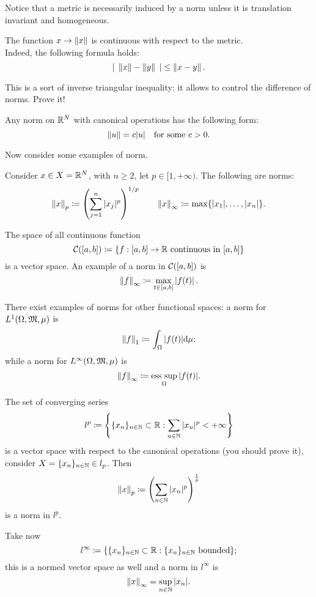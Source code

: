 Notice that a metric is necessarily induced by a norm unless it is translation invariant and homogeneous.

\begin{prop}\label{norm-inequality}
	The function $x \to \left\lVert x\right\rVert$ is continuous with respect to the metric.\\
	Indeed, the following formula holds:
	$$
		| \; \left\lVert x\right\rVert - \left\lVert y\right\rVert \; | 
		\leq \left\lVert x-y\right\rVert
	.
	$$
\end{prop}
This is a sort of inverse triangular inequality: it allows to control the  difference of norms. Prove it!

\begin{prop}
	Any norm on $\mathbb R^N$ with canonical operations has the following form: 
	$$
		\left\lVert u\right\rVert
		= c|u| \quad \text{for some } c>0
	.
	$$
\end{prop}

Now consider some examples of norm.
\begin{exam}
	Consider $x\in X = \mathbb R^N$, with $n \geq 2$, let $p \in [1, +\infty)$. The following are norms:
	$$
		\left\lVert x\right\rVert_p \coloneqq \left(\sum_{j=1}^n |x_j|^p\right)^{1/p}
		\qquad \left\lVert x\right\rVert_\infty \coloneqq \max\{|x_1|,\ldots,|x_n|\}
	.
	$$
\end{exam}
\begin{exam}		
	The space of all continuous function
	$$
		\mathcal C([a,b]) 
		\coloneqq \{f : [a,b]\to \mathbb R \text{ continuous in } [a,b]\}
	$$
	is a vector space. An example of a norm in $\mathcal C([a,b])$ is 
	$$
		\left\lVert f\right\rVert_\infty 
		\coloneqq \max_{t\in[a,b]}\left\lvert f(t)\right\rvert
		.
	$$
\end{exam}
\begin{exam}
	There exist examples of norms for other functional spaces: a norm for $L^1(\Omega, \mathfrak M, \mu)$ is 
	$$
		\left\lVert f\right\rVert_1 
		\coloneqq \int_\Omega |f(t)| \mathrm d \mu
	;
	$$
	while a norm for $L^\infty (\Omega, \mathfrak M, \mu)$ is 
	$$
		\left\lVert f\right\rVert_\infty 
		\coloneqq \operatorname*{ess\ sup}_\Omega |f(t)|
	.
	$$
\end{exam}
\begin{exam}
	The set of converging series 
	$$
		l^p 
		\coloneqq \left\{\{x_n\}_{n\in\mathbb N} \subset \mathbb R : \sum_{u\in \mathbb N} |x_u|^p < +\infty \right\}
	$$ 
	is a vector space with respect to the canonical operations (you should prove it), consider $X=\{x_n\}_{n\in \mathbb N} \in l_p$. Then 
	$$
		\left\lVert x\right\rVert_p 
		\coloneqq \left(\sum_{n\in \mathbb N} |x_n|^p\right)^\frac 1 p
	$$ 
	is a norm in $l^p$.
\end{exam}
\begin{exam}
	Take now 
	$$
		l^{\infty}  
		\coloneqq \{\{x_n\}_{n\in\mathbb N} \subset \mathbb R : \{x_n\}_{n \in \mathbb N} \text{ bounded}\}
		;
	$$ 
	this is a normed vector space as well and a norm in $l^{\infty} $ is 
	$$
		\left\lVert x\right\rVert_\infty
		=\sup_{n\in \mathbb N} |x_n|
		.
	$$
\end{exam}

